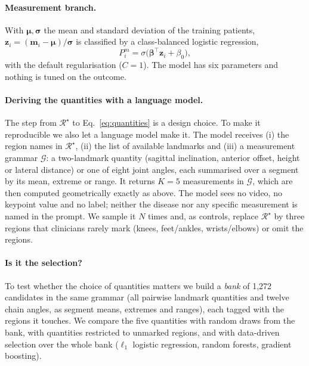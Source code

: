 \paragraph{Measurement branch.} With $\boldsymbol\mu,\boldsymbol\sigma$ the mean and standard
deviation of the training patients, $\mathbf{z}_i=(\mathbf{m}_i-\boldsymbol\mu)/\boldsymbol\sigma$
is classified by a class-balanced logistic regression,
\begin{equation}
P^{m}_i=\sigma\!\big(\boldsymbol\beta^{\top}\mathbf{z}_i+\beta_0\big),
\label{eq:lr}
\end{equation}
with the default regularisation ($C{=}1$). The model has six parameters and nothing is tuned
on the outcome.

\paragraph{Deriving the quantities with a language model.}
The step from $\mathcal{R}^{\star}$ to Eq.~\eqref{eq:quantities} is a design choice. To make
it reproducible we also let a language model make it. The model receives (i) the region names
in $\mathcal{R}^{\star}$, (ii) the list of available landmarks and (iii) a measurement
grammar $\mathcal{G}$: a two-landmark quantity (sagittal inclination, anterior offset, height
or lateral distance) or one of eight joint angles, each summarised over a segment by its
mean, extreme or range. It returns $K{=}5$ measurements in $\mathcal{G}$, which are then
computed geometrically exactly as above. The model sees no video, no keypoint value and no
label; neither the disease nor any specific measurement is named in the prompt. We sample it
$N$ times and, as controls, replace $\mathcal{R}^{\star}$ by three regions that clinicians
rarely mark (knees, feet/ankles, wrists/elbows) or omit the regions.

\paragraph{Is it the selection?} To test whether the choice of quantities matters we build a
\emph{bank} of 1,272 candidates in the same grammar (all pairwise landmark quantities and
twelve chain angles, as segment means, extremes and ranges), each tagged with the regions it
touches. We compare the five quantities with random draws from the bank, with quantities
restricted to unmarked regions, and with data-driven selection over the whole bank
($\ell_1$ logistic regression, random forests, gradient boosting).

